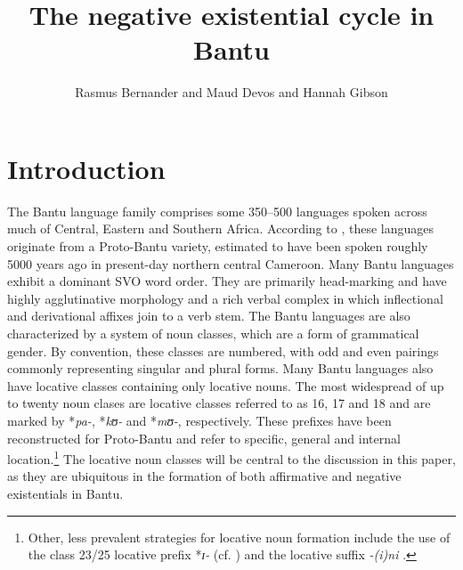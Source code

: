 \documentclass[output=paper,draft,draftmode,colorlinks,citecolor=brown]{langscibook}
\title{The negative existential cycle in Bantu}
\author{Rasmus Bernander\affiliation{University of Helsinki} and Maud Devos\affiliation{Royal Museum for Central Africa; Ghent University} and Hannah Gibson\affiliation{University of Essex}%
}
\begin{document}
\maketitle

\section{Introduction}\label{sec:1:1} The Bantu language family
comprises some 350--500 languages spoken across much of Central, Eastern
and Southern Africa. According to \citet{Grollemund2015}, these languages
originate from a Proto-Bantu variety, estimated to have been spoken
roughly 5000 years ago in present-day northern central Cameroon. Many Bantu languages exhibit a dominant SVO word order. They are
primarily head-marking and have highly agglutinative morphology and a rich
verbal complex in which inflectional and derivational affixes join to a verb stem. The Bantu languages are also characterized by a
system of noun classes, which are a form of grammatical gender. By convention,
these classes are numbered, with odd and even pairings commonly representing
singular and plural forms. Many Bantu languages also have locative classes
containing only  locative nouns. The most widespread of up to twenty noun clases are locative classes
referred to as 16, 17 and 18 and are marked by *{\it pa-}, *{\it kʊ-} and
*{\it mʊ-}, respectively. These prefixes have been reconstructed for
Proto-Bantu and refer to
specific, general and internal location.\footnote{Other, less prevalent
strategies for locative noun formation include the use of the class 23/25
locative prefix *{\it ɪ-} (cf.
\citealt{Gregoire1975,Maho1999}) and
the locative suffix {\it -(i)ni} \citep{SamsonSchadeberg1994}.} The locative noun classes will be central
to the discussion in this paper, as they are ubiquitous in the formation of
both affirmative and negative existentials in Bantu.
\end{document}
